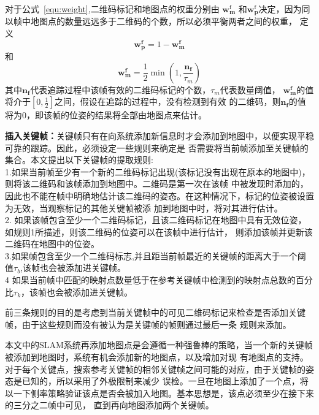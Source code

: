 对于公式~\ref{equ:weight},二维码标记和地图点的权重分别由
$\mathbf{w}_{\mathbf{m}}^{\mathrm{f}}$
和$\mathbf{w}_{\mathbf{p}}^{\mathrm{f}}$决定，因为同以帧中地图点的数量远远多于二维码的个数，所以必须平衡两者之间的权重，
定义
\begin{equation}
\mathbf{w}_{\mathbf{p}}^{\mathbf{f}}=1-\mathbf{w}_{\mathbf{m}}^{\mathbf{f}}
\end{equation}
和
\begin{equation}
  \mathbf{w}_{\mathbf{m}}^{\mathbf{f}}=\frac{1}{2} \min \left(1, \frac{\mathbf{n}_{\mathbf{f}}}{\tau_{m}}\right)
\end{equation}
其中$\mathbf{n}_{\mathbf{f}}$代表追踪过程中该帧有效的二维码标记的个数，${\tau_{m}}$代表数量阈值，
$\mathbf{w}_{\mathbf{m}}^{\mathbf{f}}$的值将介于$\left[0, \frac{1}{2}\right]$之间，假设在追踪的过程中，没有检测到有效
的二维码，则$\mathbf{n}_{\mathbf{f}}$的值将为0，即该帧的位姿的结果将全部由地图点来估计。

\textbf{插入关键帧：}关键帧只有在向系统添加新信息时才会添加到地图中，以便实现平稳可靠的跟踪。因此，必须设定一些规则来确定是
否需要将当前帧添加至关键帧的集合。本文提出以下关键帧的提取规则:\\
1.如果当前帧至少有一个新的二维码标记出现(该标记没有出现在原本的地图中)，则将该二维码和该帧添加到地图中。二维码是第一次在该帧
中被发现时添加的，因此也不能在帧中明确地估计该二维码的姿态。在这种情况下，标记的位姿被设置为无效，当观察标记的其他关键帧被添
加到地图中时，将对其进行估计。\\
2. 如果该帧包含至少一个二维码标记，且该二维码标记在地图中具有无效位姿，如规则1所描述，则该二维码的位姿可以在该帧中进行估计，
则添加该帧并更新该二维码在地图中的位姿。\\
3.如果帧包含至少一个二维码标志,并且距当前帧最近的关键帧的距离大于一个阈值$\tau_b$,该帧也会被添加进关键帧。\\
4 如果当前帧中匹配的映射点数量低于在参考关键帧中检测到的映射点总数的百分比$\tau_k$，该帧也会被添加进关键帧。

前三条规则的目的是考虑到当前关键帧中的可见二维码标记来检查是否添加关键帧，由于这些规则而没有被认为是关键帧的帧则通过最后一条
规则来添加。

本文中的SLAM系统再添加地图点是会遵循一种强鲁棒的策略，当一个新的关键帧被添加到地图时，系统有机会添加新的地图点，以及增加对现
有地图点的支持。对于每个关键点，搜索参考关键帧的相邻关键帧之间可能的对应，由于关键帧的姿态是已知的，所以采用了外极限制来减少
误检。一旦在地图上添加了一个点，将以一下侧率策略验证该点是否会被加入地图。基本思想是，该点必须至少在接下来的三分之二帧中可见，
直到再向地图添加两个关键帧。

